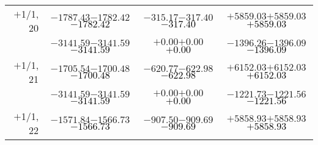 \documentclass[compress]{beamer}
\begin{document}
\begin{frame}
{\begin{tabular}{r | c | c | c}
$+$1/1, 20 & $-1787.43$\hspace{0.1 cm}$-1782.42$\hspace{0.1 cm}\textcolor{black}{$-1782.42$} & $-315.17$\hspace{0.1 cm}$-317.40$\hspace{0.1 cm}\textcolor{black}{$-317.40$} & $+5859.03$\hspace{0.1 cm}$+5859.03$\hspace{0.1 cm}\textcolor{black}{$+5859.03$} \\
           & $-3141.59$\hspace{0.1 cm}$-3141.59$\hspace{0.1 cm}\textcolor{black}{$-3141.59$} & $+0.00$\hspace{0.1 cm}$+0.00$\hspace{0.1 cm}\textcolor{black}{$+0.00$} & $-1396.26$\hspace{0.1 cm}$-1396.09$\hspace{0.1 cm}\textcolor{black}{$-1396.09$} \\
$+$1/1, 21 & $-1705.54$\hspace{0.1 cm}$-1700.48$\hspace{0.1 cm}\textcolor{black}{$-1700.48$} & $-620.77$\hspace{0.1 cm}$-622.98$\hspace{0.1 cm}\textcolor{black}{$-622.98$} & $+6152.03$\hspace{0.1 cm}$+6152.03$\hspace{0.1 cm}\textcolor{black}{$+6152.03$} \\
           & $-3141.59$\hspace{0.1 cm}$-3141.59$\hspace{0.1 cm}\textcolor{black}{$-3141.59$} & $+0.00$\hspace{0.1 cm}$+0.00$\hspace{0.1 cm}\textcolor{black}{$+0.00$} & $-1221.73$\hspace{0.1 cm}$-1221.56$\hspace{0.1 cm}\textcolor{black}{$-1221.56$} \\
$+$1/1, 22 & $-1571.84$\hspace{0.1 cm}$-1566.73$\hspace{0.1 cm}\textcolor{black}{$-1566.73$} & $-907.50$\hspace{0.1 cm}$-909.69$\hspace{0.1 cm}\textcolor{black}{$-909.69$} & $+5858.93$\hspace{0.1 cm}$+5858.93$\hspace{0.1 cm}\textcolor{black}{$+5858.93$} \\

\end{tabular}}
\end{frame}
\end{document}

